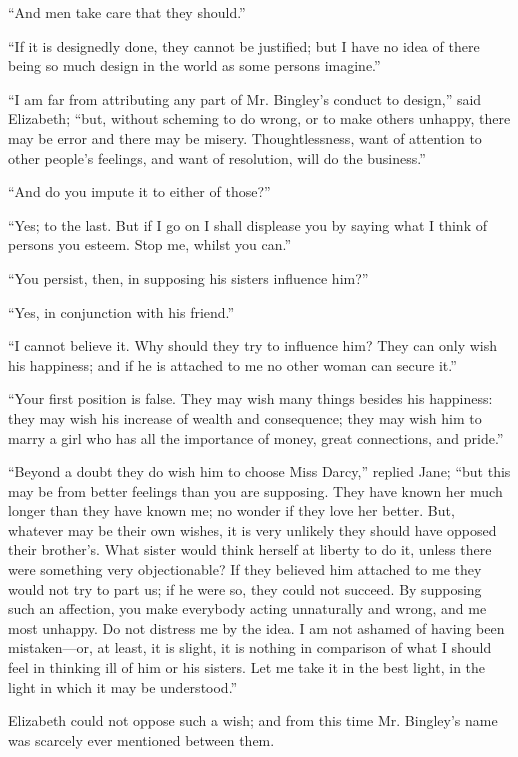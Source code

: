 ``And men take care that they should.''

``If it is designedly done, they cannot be justified; but I have no idea of there being so much design in the world as some persons imagine.''

``I am far from attributing any part of Mr. Bingley's conduct to design,'' said Elizabeth; ``but, without scheming to do wrong, or to make others unhappy, there may be error and there may be misery. Thoughtlessness, want of attention to other people's feelings, and want of resolution, will do the business.''

``And do you impute it to either of those?''

``Yes; to the last. But if I go on I shall displease you by saying what I think of persons you esteem. Stop me, whilst you can.''

``You persist, then, in supposing his sisters influence him?''

``Yes, in conjunction with his friend.''

``I cannot believe it. Why should they try to influence him? They can only wish his happiness; and if he is attached to me no other woman can secure it.''

``Your first position is false. They may wish many things besides his happiness: they may wish his increase of wealth and consequence; they may wish him to marry a girl who has all the importance of money, great connections, and pride.''

``Beyond a doubt they do wish him to choose Miss Darcy,'' replied Jane; ``but this may be from better feelings than you are supposing. They have known her much longer than they have known me; no wonder if they love her better. But, whatever may be their own wishes, it is very unlikely they should have opposed their brother's. What sister would think herself at liberty to do it, unless there were something very objectionable? If they believed him attached to me they would not try to part us; if he were so, they could not succeed. By supposing such an affection, you make everybody acting unnaturally and wrong, and me most unhappy. Do not distress me by the idea. I am not ashamed of having been mistaken---or, at least, it is slight, it is nothing in comparison of what I should feel in thinking ill of him or his sisters. Let me take it in the best light, in the light in which it may be understood.''

Elizabeth could not oppose such a wish; and from this time Mr. Bingley's name was scarcely ever mentioned between them.

